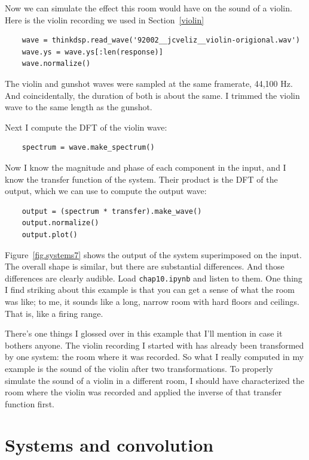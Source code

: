 \documentclass[12pt]{book}
\begin{document}
Now we can simulate the effect this room would have on the sound
of a violin.  Here is the violin recording we used in Section~\ref{violin}

\begin{verbatim}
    wave = thinkdsp.read_wave('92002__jcveliz__violin-origional.wav')
    wave.ys = wave.ys[:len(response)]
    wave.normalize()
\end{verbatim}

The violin and gunshot waves were sampled at the same framerate,
44,100 Hz.  And coincidentally, the duration of both is about the
same.  I trimmed the violin wave to the same length as the gunshot.

Next I compute the DFT of the violin wave:

\begin{verbatim}
    spectrum = wave.make_spectrum()
\end{verbatim}

Now I know the magnitude and phase of each component in the
input, and I know the transfer function of the system.  Their
product is the DFT of the output, which we can use to compute the
output wave:

\begin{verbatim}
    output = (spectrum * transfer).make_wave()
    output.normalize()
    output.plot()
\end{verbatim}

Figure~\ref{fig.systems7} shows the output of the system superimposed
on the input.  The overall shape is similar, but there are substantial
differences.  And those differences are clearly audible.  Load
{\tt chap10.ipynb} and listen to them.  One thing I find striking
about this example is that you can get a sense of what the room
was like; to me, it sounds like a long, narrow room with hard floors
and ceilings.  That is, like a firing range.

There's one things I glossed over in this example that I'll mention
in case it bothers anyone.  The violin recording I started with
has already been transformed by one system: the room where it was
recorded.  So what I really computed in my example is the sound
of the violin after two transformations.  To properly simulate
the sound of a violin in a different room, I should have characterized
the room where the violin was recorded and applied the inverse
of that transfer function first.


\section{Systems and convolution}
\end{document}
